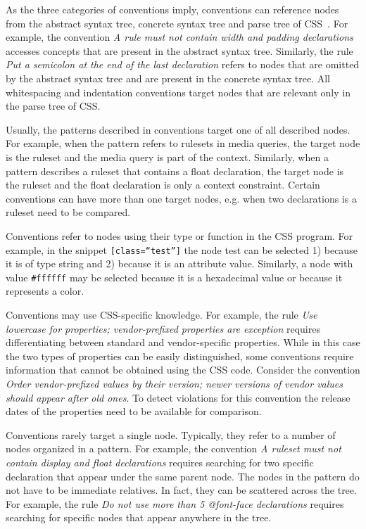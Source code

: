 As the three categories of conventions imply, conventions can reference nodes
from the abstract syntax tree, concrete syntax tree and parse tree of
CSS~\cite{zaytsev2014parsing}. For example, the convention \textit{A rule must
not contain width and padding declarations} accesses concepts that are present
in the abstract syntax tree. Similarly, the rule \textit{Put a semicolon at
the end of the last declaration} refers to nodes that are omitted by the
abstract syntax tree and are present in the concrete syntax tree. All
whitespacing and indentation conventions target nodes that are relevant only
in the parse tree of CSS.

Usually, the patterns described in conventions target one of all described
nodes. For example, when the pattern refers to rulesets in media queries, the
target node is the ruleset and the media query is part of the context.
Similarly, when a pattern describes a ruleset that contains a float
declaration, the target node is the ruleset and the float declaration is only
a context constraint. Certain conventions can have more than one target nodes,
e.g. when two declarations is a ruleset need to be compared.

Conventions refer to nodes using their type or function in the CSS program.
For example, in the snippet \texttt{[class=``test'']} the node test can be
selected 1) because it is of type string and 2) because it is an attribute
value. Similarly, a node with value \texttt{\#ffffff} may be selected because
it is a hexadecimal value or because it represents a color.

Conventions may use CSS-specific knowledge. For example, the rule \textit{Use
lowercase for properties; vendor-prefixed properties are exception} requires
differentiating between standard and vendor-specific properties. While in this
case the two types of properties can be easily distinguished, some conventions
require information that cannot be obtained using the CSS code. Consider the
convention \textit{Order vendor-prefixed values by their version; newer
versions of vendor values should appear after old ones}. To detect violations
for this convention the release dates of the properties need to be available
for comparison.

Conventions rarely target a single node. Typically, they refer to a number of
nodes organized in a pattern. For example, the convention \textit{A ruleset
must not contain display and float declarations} requires searching for two
specific declaration that appear under the same parent node. The nodes in the
pattern do not have to be immediate relatives. In fact, they can be scattered
across the tree. For example, the rule \textit{Do not use more than 5
@font-face declarations} requires searching for specific nodes that appear
anywhere in the tree.


